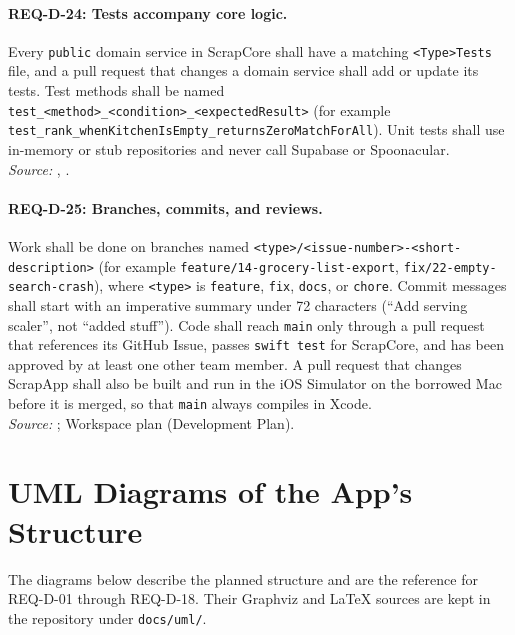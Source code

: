 \paragraph{REQ-D-24: Tests accompany core logic.}
 Every \texttt{public} domain service in ScrapCore shall have a matching \texttt{<Type>Tests} file, and a pull request that changes a domain service shall add or update its tests. Test methods shall be named \texttt{test\_<method>\_}\allowbreak\texttt{<condition>\_}\allowbreak\texttt{<expectedResult>} (for example \texttt{test\_rank\_}\allowbreak\texttt{whenKitchenIsEmpty\_}\allowbreak\texttt{returnsZeroMatchForAll}). Unit tests shall use in-memory or stub repositories and never call Supabase or Spoonacular.\\
\textit{Source:} , .

\paragraph{REQ-D-25: Branches, commits, and reviews.}
 Work shall be done on branches named \texttt{<type>/}\allowbreak\texttt{<issue-number>-}\allowbreak\texttt{<short-description>} (for example \texttt{feature/}\allowbreak\texttt{14-grocery-list-export}, \texttt{fix/22-empty-search-crash}), where \texttt{<type>} is \texttt{feature}, \texttt{fix}, \texttt{docs}, or \texttt{chore}. Commit messages shall start with an imperative summary under 72 characters (``Add serving scaler'', not ``added stuff''). Code shall reach \texttt{main} only through a pull request that references its GitHub Issue, passes \texttt{swift test} for ScrapCore, and has been approved by at least one other team member. A pull request that changes ScrapApp shall also be built and run in the iOS Simulator on the borrowed Mac before it is merged, so that \texttt{main} always compiles in Xcode.\\
\textit{Source:} ; Workspace plan (Development Plan).

\section{UML Diagrams of the App's Structure}

The diagrams below describe the planned structure and are the reference for REQ-D-01 through REQ-D-18. Their Graphviz and \LaTeX{} sources are kept in the repository under \texttt{docs/uml/}.

